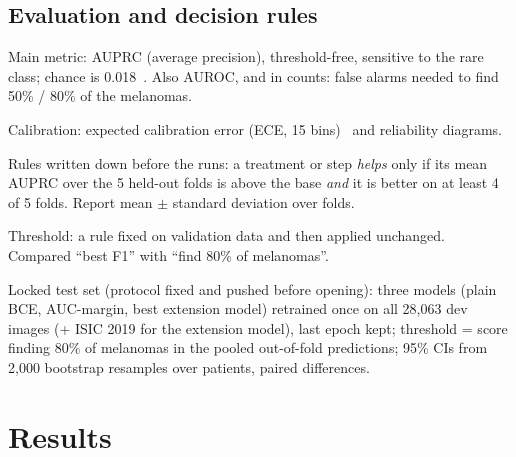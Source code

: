 \subsection{Evaluation and decision rules}
\begin{notes}[~200 words]
  \item Main metric: AUPRC (average precision), threshold-free, sensitive to the rare class; chance is 0.018~\cite{saito2015precision}. Also AUROC, and in counts: false alarms needed to find 50\% / 80\% of the melanomas.
  \item Calibration: expected calibration error (ECE, 15 bins)~\cite{guo2017calibration} and reliability diagrams.
  \item Rules written down before the runs: a treatment or step \emph{helps} only if its mean AUPRC over the 5 held-out folds is above the base \emph{and} it is better on at least 4 of 5 folds. Report mean $\pm$ standard deviation over folds.
  \item Threshold: a rule fixed on validation data and then applied unchanged. Compared ``best F1'' with ``find 80\% of melanomas''.
  \item Locked test set (protocol fixed and pushed before opening): three models (plain BCE, AUC-margin, best extension model) retrained once on all 28,063 dev images (+ ISIC 2019 for the extension model), last epoch kept; threshold = score finding 80\% of melanomas in the pooled out-of-fold predictions; 95\% CIs from 2,000 bootstrap resamples over patients, paired differences.
\end{notes}

\section{Results}
\label{sec:results}

